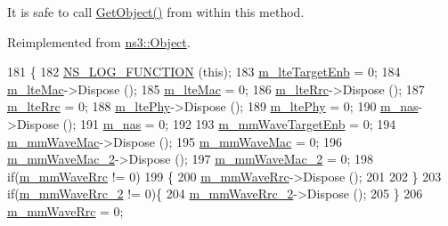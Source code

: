 It is safe to call \hyperlink{classns3_1_1Object_a13e18c00017096c8381eb651d5bd0783}{Get\+Object()} from within this method. 

Reimplemented from \hyperlink{classns3_1_1Object_a475d429a75d302d4775f4ae32479b287}{ns3\+::\+Object}.


\begin{DoxyCode}
181 \{
182         \hyperlink{log-macros-disabled_8h_a90b90d5bad1f39cb1b64923ea94c0761}{NS\_LOG\_FUNCTION} (\textcolor{keyword}{this});
183         \hyperlink{classns3_1_1McUeNetDevice_af356308a68332afec53c00d213c3b20a}{m\_lteTargetEnb} = 0;
184         \hyperlink{classns3_1_1McUeNetDevice_ae4f49b8ba86613c84fd16176762c653c}{m\_lteMac}->Dispose ();
185         \hyperlink{classns3_1_1McUeNetDevice_ae4f49b8ba86613c84fd16176762c653c}{m\_lteMac} = 0;
186         \hyperlink{classns3_1_1McUeNetDevice_aac81a393e1f9101f016915c957e91d97}{m\_lteRrc}->Dispose ();
187         \hyperlink{classns3_1_1McUeNetDevice_aac81a393e1f9101f016915c957e91d97}{m\_lteRrc} = 0;
188         \hyperlink{classns3_1_1McUeNetDevice_a740afd04e5cbf2fdde0de8877a463069}{m\_ltePhy}->Dispose ();
189         \hyperlink{classns3_1_1McUeNetDevice_a740afd04e5cbf2fdde0de8877a463069}{m\_ltePhy} = 0;
190         \hyperlink{classns3_1_1McUeNetDevice_ad28cd170780f825a1d8b12beb814a511}{m\_nas}->Dispose ();
191         \hyperlink{classns3_1_1McUeNetDevice_ad28cd170780f825a1d8b12beb814a511}{m\_nas} = 0;
192 
193         \hyperlink{classns3_1_1McUeNetDevice_a395d39a9059ce8f5f0cc6fd7415f9e53}{m\_mmWaveTargetEnb} = 0;
194         \hyperlink{classns3_1_1McUeNetDevice_a6044ae25fdaf2ed67afa92e03f2c6449}{m\_mmWaveMac}->Dispose ();
195         \hyperlink{classns3_1_1McUeNetDevice_a6044ae25fdaf2ed67afa92e03f2c6449}{m\_mmWaveMac} = 0;
196         \hyperlink{classns3_1_1McUeNetDevice_a78351356a33d01051eac1fe002b8c6b3}{m\_mmWaveMac\_2}->Dispose ();
197                 \hyperlink{classns3_1_1McUeNetDevice_a78351356a33d01051eac1fe002b8c6b3}{m\_mmWaveMac\_2} = 0;
198   \textcolor{keywordflow}{if}(\hyperlink{classns3_1_1McUeNetDevice_aee9cd8974389dbb0260b3c274cd55f82}{m\_mmWaveRrc} != 0)
199   \{
200     \hyperlink{classns3_1_1McUeNetDevice_aee9cd8974389dbb0260b3c274cd55f82}{m\_mmWaveRrc}->Dispose ();
201 
202   \}
203   \textcolor{keywordflow}{if}(\hyperlink{classns3_1_1McUeNetDevice_a47adcb400e9cdf80e1618a5e693ee2ee}{m\_mmWaveRrc\_2} != 0)\{
204           \hyperlink{classns3_1_1McUeNetDevice_a47adcb400e9cdf80e1618a5e693ee2ee}{m\_mmWaveRrc\_2}->Dispose ();
205   \}
206         \hyperlink{classns3_1_1McUeNetDevice_aee9cd8974389dbb0260b3c274cd55f82}{m\_mmWaveRrc} = 0;

\end{DoxyCode}
